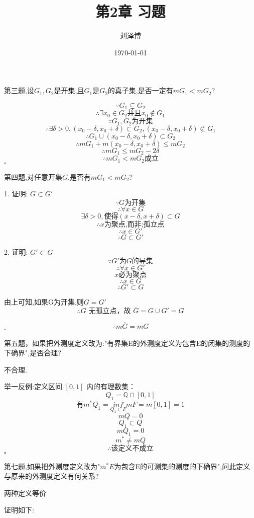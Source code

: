 \documentclass[a4paper]{article}
\title{第2章 习题}
\author{刘泽博}
\date{\today}
\begin{document}
    \maketitle
    第三题,设$G_1,G_2$是开集,且$G_1$是$G_2$的真子集,是否一定有$mG_1<mG_2$?

        \[\because G_1 \subsetneq G_2\]
        \[\therefore \exists x_0 \in G_2 \text{并且}  x_0 \notin G_1\]
        \[\because G_1,G_2 \text{为开集}\]
        \[\therefore \exists \delta > 0,(x_0 - \delta,x_0 + \delta) \subset G_2,(x_0 - \delta,x_0 + \delta)\not\subset G_1\]
        \[\therefore G_1\cup(x_0 - \delta,x_0 + \delta) \subset G_2\]
        \[\therefore mG_1 + m(x_0 - \delta,x_0 + \delta) \leq mG_2\]
        \[\therefore mG_1 \leq mG_2 - 2\delta\]
        \[\therefore mG_1<mG_2 \text{成立}\]
    \hfill $\square$

    第四题,对任意开集$G$,是否有$mG_1<mG_2$?

        1. 证明: $G \subset G'$
        \[\because G \text{为开集}\]
        \[\therefore \forall x \in G\]
        \[\exists \delta > 0,\text{使得}(x-\delta,x+\delta)\subset G\]
        \[\therefore x \text{为聚点,而非;孤立点}\]
        \[\therefore x \in G'\]
        \[\therefore G \subset G'\]

        2. 证明: $G' \subset G$
        \[\because G'\text{为} G \text{的导集}\]
        \[\therefore \forall x \in G'\]
        \[x \text{必为聚点}\]
        \[\therefore x \in G\]
        \[\therefore G' \subset G\]

        由上可知,如果G为开集,则$G = G'$
        \[\therefore G \text{ 无孤立点，故 } \overline{G} = G \cup G' = G\]

        \[\therefore m\overline{G}=mG\]
    \hfill $\square$

    第五题，如果把外测度定义改为:"有界集E的外测度定义为包含E的闭集的测度的下确界",是否合理?

        不合理.

        举一反例:定义区间 $[0,1]$ 内的有理数集：
        \[Q_1=\mathbb{Q}\cap[0,1]\]
        \[\text{有}m^{*}Q_1=\underset{Q_1\subset F}{inf}mF=m[0,1]=1\]
        \[mQ=0\]
        \[Q_1\subset Q\]
        \[mQ_1=0\]
        \[m^{*}\ne mQ\]
        \[\therefore \text{该定义不成立}\]
    \hfill $\square$

    第七题,如果把外测度定义改为"$m^{*}E$为包含E的可测集的测度的下确界",问此定义与原来的外测度定义有何关系?

        两种定义等价

        证明如下:
\end{document}
